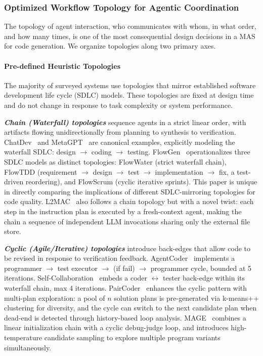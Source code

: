 \subsubsection{Optimized Workflow Topology for Agentic Coordination}

The topology of agent interaction, who communicates with whom, in
what order, and how many times, is one of the most consequential
design decisions in a MAS for code generation. We organize
topologies along two primary axes.

\paragraph{Pre-defined Heuristic Topologies}
The majority of surveyed systems use topologies that mirror
established software development life cycle (SDLC) models. These
topologies are fixed at design time and do not change in response
to task complexity or system performance.

\textbf{\textit{Chain (Waterfall) topologies}} sequence agents in
a strict linear order, with artifacts flowing unidirectionally
from planning to synthesis to verification. ChatDev~\cite{Qian2023ChatDev}
and MetaGPT~\cite{Hong2023MetaGPT} are canonical examples,
explicitly modeling the waterfall SDLC: design $\rightarrow$
coding $\rightarrow$ testing. FlowGen~\cite{Lin2025Soen101}
operationalizes three SDLC models as distinct topologies:
FlowWater (strict waterfall chain), FlowTDD (requirement
$\rightarrow$ design $\rightarrow$ test $\rightarrow$
implementation $\rightarrow$ fix, a test-driven reordering), and
FlowScrum (cyclic iterative sprints). This paper is unique in
directly comparing the implications of different
SDLC-mirroring topologies for code quality.
L2MAC~\cite{Holt2023L2MAC} also follows a chain topology but with
a novel twist: each step in the instruction plan is executed by a
fresh-context agent, making the chain a sequence of independent
LLM invocations sharing only the external file store.

\textbf{\textit{Cyclic (Agile/Iterative) topologies}} introduce
back-edges that allow code to be revised in response to
verification feedback. AgentCoder~\cite{huang2023agentcoder}
implements a programmer $\rightarrow$ test executor $\rightarrow$
(if fail) $\rightarrow$ programmer cycle, bounded at 5
iterations. Self-Collaboration~\cite{Dong2024SelfCollaboration}
embeds a coder $\leftrightarrow$ tester back-edge within its
waterfall chain, max 4 iterations.
PairCoder~\cite{Zhang2024PairProgramming} enhances the cyclic
pattern with multi-plan exploration: a pool of $n$ solution plans
is pre-generated via k-means++ clustering for diversity, and the
cycle can switch to the next candidate plan when dead-end is
detected through history-based loop analysis.
MAGE~\cite{Zhao2024MAGE} combines a linear initialization chain
with a cyclic debug-judge loop, and introduces high-temperature
candidate sampling to explore multiple program variants
simultaneously.

